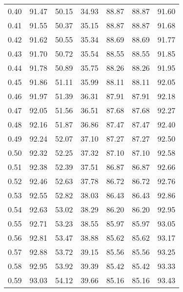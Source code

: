 \begin{tabular}{|c|c|c|c|c|c|c|}
      0.40 &     91.47 &     50.15 &      34.93 &   88.87 &      88.87 &         91.60 \\
      0.41 &     91.55 &     50.37 &      35.15 &   88.87 &      88.87 &         91.68 \\
      0.42 &     91.62 &     50.55 &      35.34 &   88.69 &      88.69 &         91.77 \\
      0.43 &     91.70 &     50.72 &      35.54 &   88.55 &      88.55 &         91.85 \\
      0.44 &     91.78 &     50.89 &      35.75 &   88.26 &      88.26 &         91.95 \\
      0.45 &     91.86 &     51.11 &      35.99 &   88.11 &      88.11 &         92.05 \\
      0.46 &     91.97 &     51.39 &      36.31 &   87.91 &      87.91 &         92.18 \\
      0.47 &     92.05 &     51.56 &      36.51 &   87.68 &      87.68 &         92.27 \\
      0.48 &     92.16 &     51.87 &      36.86 &   87.47 &      87.47 &         92.40 \\
      0.49 &     92.24 &     52.07 &      37.10 &   87.27 &      87.27 &         92.50 \\
      0.50 &     92.32 &     52.25 &      37.32 &   87.10 &      87.10 &         92.58 \\
      0.51 &     92.38 &     52.39 &      37.51 &   86.87 &      86.87 &         92.66 \\
      0.52 &     92.46 &     52.63 &      37.78 &   86.72 &      86.72 &         92.76 \\
      0.53 &     92.55 &     52.82 &      38.03 &   86.43 &      86.43 &         92.86 \\
      0.54 &     92.63 &     53.02 &      38.29 &   86.20 &      86.20 &         92.95 \\
      0.55 &     92.71 &     53.23 &      38.55 &   85.97 &      85.97 &         93.05 \\
      0.56 &     92.81 &     53.47 &      38.88 &   85.62 &      85.62 &         93.17 \\
      0.57 &     92.88 &     53.72 &      39.15 &   85.56 &      85.56 &         93.25 \\
      0.58 &     92.95 &     53.92 &      39.39 &   85.42 &      85.42 &         93.33 \\
      0.59 &     93.03 &     54.12 &      39.66 &   85.16 &      85.16 &         93.43 \\

\end{tabular}
